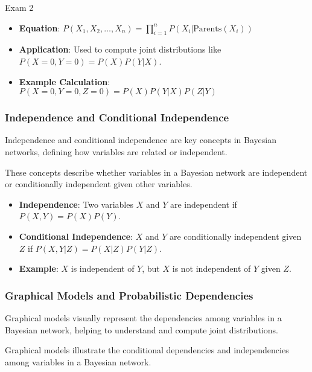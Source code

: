 \begin{examnotes}{Exam 2}
\begin{highlight}
        \begin{itemize}
            \item \textbf{Equation}: $P(X_1, X_2, \dots, X_n) = \prod_{i=1}^{n} P(X_i | \text{Parents}(X_i))$
            \item \textbf{Application}: Used to compute joint distributions like $P(X = 0, Y = 0) = P(X)P(Y | X)$.
            \item \textbf{Example Calculation}: $P(X = 0, Y = 0, Z = 0) = P(X)P(Y | X)P(Z | Y)$
        \end{itemize}
    \end{highlight}
    
    \subsubsection*{Independence and Conditional Independence}
    
    Independence and conditional independence are key concepts in Bayesian networks, defining how variables are related or independent.
    
    \begin{highlight}
        These concepts describe whether variables in a Bayesian network are independent or conditionally independent given other variables.
        
        \begin{itemize}
            \item \textbf{Independence}: Two variables $X$ and $Y$ are independent if $P(X, Y) = P(X)P(Y)$.
            \item \textbf{Conditional Independence}: $X$ and $Y$ are conditionally independent given $Z$ if $P(X, Y | Z) = P(X | Z)P(Y | Z)$.
            \item \textbf{Example}: $X$ is independent of $Y$, but $X$ is not independent of $Y$ given $Z$.
        \end{itemize}
    \end{highlight}
    
    \subsubsection*{Graphical Models and Probabilistic Dependencies}
    
    Graphical models visually represent the dependencies among variables in a Bayesian network, helping to understand and compute joint distributions.
    
    \begin{highlight}
        Graphical models illustrate the conditional dependencies and independencies among variables in a Bayesian network.
        

\end{highlight}
\end{examnotes}
